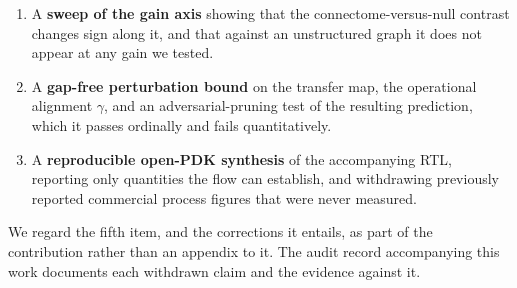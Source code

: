 \begin{enumerate}[leftmargin=1.2em,itemsep=2pt]
with the silencing hypothesis we proposed for the difference supported against the
published null after we had reported it as refuted against the other one.
\item A \textbf{sweep of the gain axis} showing that the connectome-versus-null contrast
changes sign along it, and that against an unstructured graph it does not appear at any
gain we tested.
\item A \textbf{gap-free perturbation bound} on the transfer map, the operational
alignment $\gamma$, and an adversarial-pruning test of the resulting prediction, which
it passes ordinally and fails quantitatively.
\item A \textbf{reproducible open-PDK synthesis} of the accompanying RTL, reporting
only quantities the flow can establish, and withdrawing previously reported commercial
process figures that were never measured.
\end{enumerate}

We regard the fifth item, and the corrections it entails, as part of the contribution
rather than an appendix to it. The audit record accompanying this work documents each
withdrawn claim and the evidence against it.

